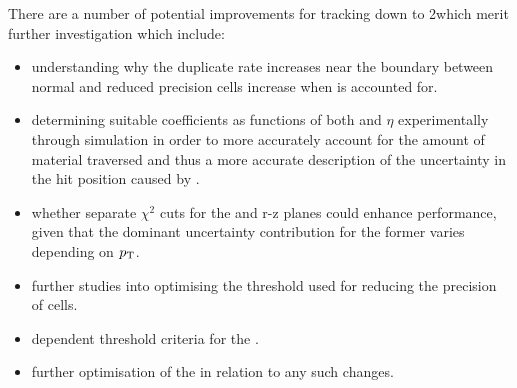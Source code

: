 There are a number of potential improvements for tracking down to 2\GeV which merit further investigation which include:
\begin{itemize}
\item understanding why the duplicate rate increases near the boundary between normal and reduced precision \HT cells increase when \MS is accounted for.
\item determining suitable coefficients as functions of both \pT and $\eta$ experimentally through simulation in order to more accurately account for the amount of material traversed and thus a more accurate description of the uncertainty in the hit position caused by \MS.
\item whether separate \KF $\chi^{2}$ cuts for the \rphi and r-z planes could enhance performance, given that the dominant uncertainty contribution for the former varies depending on $p_{\mathrm{T}}$.
\item further studies into optimising the \pT threshold used for reducing the precision of \HT cells.
\item \pt dependent threshold criteria for the \HT.
\item further optimisation of the \KF in relation to any such changes.
\end{itemize}
